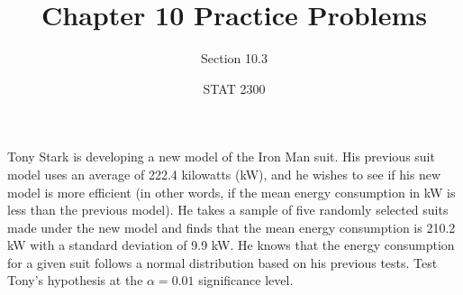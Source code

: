 \documentclass[noanswers]{exam}
\title{Chapter 10 Practice Problems}
\author{Section 10.3}
\date{STAT 2300}
\begin{document}
%

\begin{questions} 

\question Tony Stark is developing a new model of the Iron Man suit. His previous suit model uses an average of 222.4 kilowatts (kW), and he wishes to see if his new model is more efficient (in other words, if the mean energy consumption in kW is less than the previous model). He takes a sample of five randomly selected suits made under the new model and finds that the mean energy consumption is 210.2 kW with a standard deviation of 9.9 kW. He knows that the energy consumption for a given suit follows a normal distribution based on his previous tests. Test Tony's hypothesis at the $\alpha=0.01$ significance level.

\vspace{3mm}

\end{questions}
\end{document}
